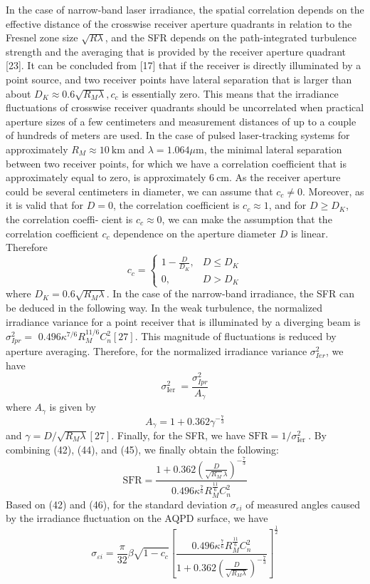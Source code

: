 \documentclass[10pt]{article}
\begin{document}
In the case of narrow-band laser irradiance, the spatial correlation depends on the effective distance of the crosswise receiver aperture quadrants in relation to the Fresnel zone size \(\sqrt{R \lambda}\), and the SFR depends on the path-integrated turbulence strength and the averaging that is provided by the receiver aperture quadrant [23]. It can be concluded from [17] that if the receiver is directly illuminated by a point source, and two receiver points have lateral separation that is larger than about \(D_{K} \approx 0.6 \sqrt{R_{M} \lambda}, c_{c}\) is essentially zero. This means that the irradiance fluctuations of crosswise receiver quadrants should be uncorrelated when practical aperture sizes of a few centimeters and measurement distances of up to a couple of hundreds of meters are used. In the case of pulsed laser-tracking systems for approximately \(R_{M} \approx 10 \mathrm{~km}\) and \(\lambda=1.064 \mu \mathrm{m}\), the minimal lateral separation between two receiver points, for which we have a correlation coefficient that is approximately equal to zero, is approximately \(6 \mathrm{~cm}\). As the receiver aperture could be several centimeters in diameter, we can assume that \(c_{c} \neq 0\). Moreover, as it is valid that for \(D=0\), the correlation coefficient is \(c_{c} \approx 1\), and for \(D \geq D_{K}\), the correlation coeffi- cient is \(c_{c} \approx 0\), we can make the assumption that the correlation coefficient \(c_{c}\) dependence on the aperture diameter \(D\) is linear. Therefore
\[
c_{c}=\left\{\begin{array}{ll}
1-\frac{D}{D_{K}}, & D \leq D_{K} \\
0, & D>D_{K}
\end{array}\right.
\]
where \(D_{K}=0.6 \sqrt{R_{M} \lambda}\). In the case of the narrow-band irradiance, the SFR can be deduced in the following way. In the weak turbulence, the normalized irradiance variance for a point receiver that is illuminated by a diverging beam is \(\sigma_{I p r}^{2}=\) \(0.496 \kappa^{7 / 6} R_{M}^{11 / 6} C_{n}^{2}[27] .\) This magnitude of fluctuations is reduced by aperture averaging. Therefore, for the normalized irradiance variance \(\sigma_{I e r}^{2}\), we have
\[
\sigma_{\text {Ier }}^{2}=\frac{\sigma_{I p r}^{2}}{A_{\gamma}}
\]
where \(A_{\gamma}\) is given by
\[
A_{\gamma}=1+0.362 \gamma^{-\frac{7}{3}}
\]
and \(\gamma=D / \sqrt{R_{M} \lambda}[27] .\) Finally, for the SFR, we have \(\mathrm{SFR}=1 / \sigma_{\text {Ier }}^{2}\). By combining (42), (44), and (45), we finally obtain the following:
\[
\mathrm{SFR}=\frac{1+0.362\left(\frac{D}{\sqrt{R_{M}} \lambda}\right)^{-\frac{7}{3}}}{0.496 \kappa^{\frac{7}{6}} R_{M}^{\frac{11}{6}} C_{n}^{2}}
\]
Based on (42) and (46), for the standard deviation \(\sigma_{\varepsilon i}\) of measured angles caused by the irradiance fluctuation on the AQPD surface, we have
\[
\sigma_{\varepsilon i}=\frac{\pi}{32} \beta \sqrt{1-c_{c}}\left[\frac{0.496 \kappa^{\frac{7}{6}} R_{M}^{\frac{11}{6}} C_{n}^{2}}{1+0.362\left(\frac{D}{\sqrt{R_{M} \lambda}}\right)^{-\frac{7}{3}}}\right]^{\frac{1}{2}}
\]
\end{document}
